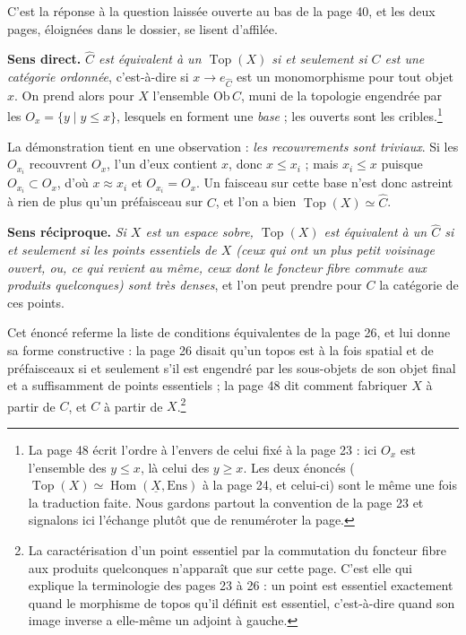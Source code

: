 \documentclass[11pt,a4paper]{article}
\begin{document}
C'est la réponse à la question laissée ouverte au bas de la page 40, et les
deux pages, éloignées dans le dossier, se lisent d'affilée.

\textbf{Sens direct.} \emph{$\widehat{C}$ est équivalent à un
$\operatorname{Top}(X)$ si et seulement si $C$ est une catégorie ordonnée},
c'est-à-dire si $x \to e_{\widehat{C}}$ est un monomorphisme pour tout objet
$x$. On prend alors pour $X$ l'ensemble $\mathrm{Ob}\,C$, muni de la topologie
engendrée par les $O_{x} = \{ y \mid y \leq x \}$, lesquels en forment une
\emph{base} ; les ouverts sont les cribles.\footnote{La page 48 écrit l'ordre à
l'envers de celui fixé à la page 23 : ici $O_{x}$ est l'ensemble des
$y \leq x$, là celui des $y \geq x$. Les deux énoncés ($\operatorname{Top}(X)
\simeq \operatorname{Hom}(\underline{X}, \mathrm{Ens})$ à la page 24, et celui-ci)
sont le même une fois la traduction faite. Nous gardons partout la convention
de la page 23 et signalons ici l'échange plutôt que de renuméroter la page.}

La démonstration tient en une observation : \emph{les recouvrements sont
triviaux}. Si les $O_{x_{i}}$ recouvrent $O_{x}$, l'un d'eux contient $x$,
donc $x \leq x_{i}$ ; mais $x_{i} \leq x$ puisque $O_{x_{i}} \subset O_{x}$,
d'où $x \approx x_{i}$ et $O_{x_{i}} = O_{x}$. Un faisceau sur cette base n'est
donc astreint à rien de plus qu'un préfaisceau sur $C$, et l'on a bien
$\operatorname{Top}(X) \simeq \widehat{C}$.

\textbf{Sens réciproque.} \emph{Si $X$ est un espace sobre,
$\operatorname{Top}(X)$ est équivalent à un $\widehat{C}$ si et seulement si
les points essentiels de $X$ (ceux qui ont un plus petit voisinage ouvert, ou,
ce qui revient au même, ceux dont le foncteur fibre commute aux produits
quelconques) sont très denses}, et l'on peut prendre pour $C$ la catégorie de
ces points.

Cet énoncé referme la liste de conditions équivalentes de la
page 26, et lui donne sa forme constructive : la page 26 disait qu'un topos est
à la fois spatial et de préfaisceaux si et seulement s'il est engendré par les
sous-objets de son objet final et a suffisamment de points essentiels ; la
page 48 dit comment fabriquer $X$ à partir de $C$, et $C$ à partir de
$X$.\footnote{La caractérisation d'un point essentiel par la commutation du
foncteur fibre aux produits quelconques n'apparaît que sur cette page. C'est
elle qui explique la terminologie des pages 23 à 26 : un point est essentiel exactement
quand le morphisme de topos qu'il définit est essentiel, c'est-à-dire quand son
image inverse a elle-même un adjoint à gauche.}
\end{document}
